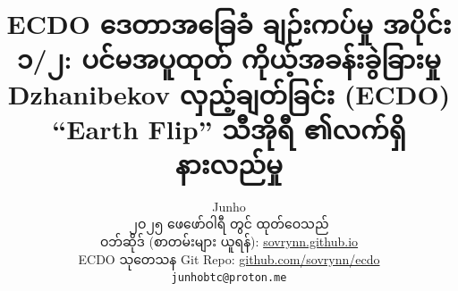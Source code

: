 \documentclass[10pt,twocolumn,letterpaper]{article}
\begin{document}
\title{ECDO ဒေတာအခြေခံ ချဉ်းကပ်မှု အပိုင်း ၁/၂: ပင်မအပူထုတ် ကိုယ့်အခန်းခွဲခြားမှု Dzhanibekov လှည့်ချတ်ခြင်း (ECDO) “Earth Flip” သီအိုရီ ၏လက်ရှိနားလည်မှု}

\author{Junho\\
၂ဝ၂၅ ဖေဖော်ဝါရီ တွင် ထုတ်ဝေသည်\\
ဝဘ်ဆိုဒ် (စာတမ်းများ ယူရန်): \href{https://sovrynn.github.io}{sovrynn.github.io}\\
ECDO သုတေသန Git Repo: \href{https://github.com/sovrynn/ecdo}{github.com/sovrynn/ecdo}\\
{\tt\small junhobtc@proton.me}
}

\maketitle
\end{document}

